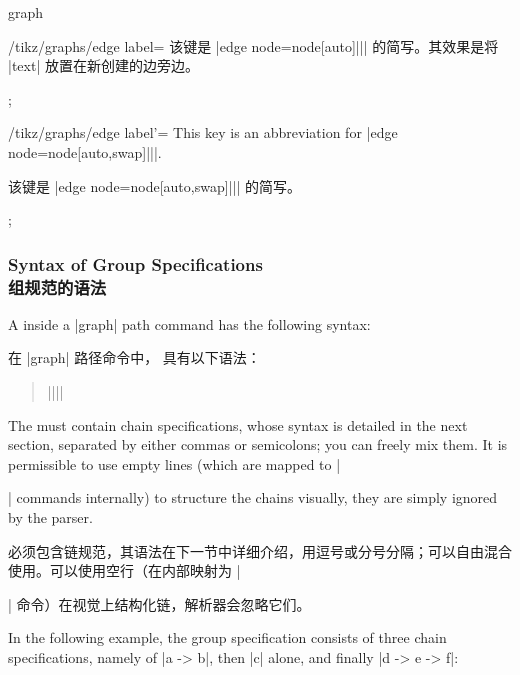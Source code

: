 \begin{pathoperation}{graph}{}
\begin{key}{/tikz/graphs/edge label=}
        该键是 |edge node=node[auto]{||}| 的简写。其效果是将 |text| 放置在新创建的边旁边。

%
\begin{codeexample}[preamble={\usetikzlibrary{graphs}}]
\tikz {};
\end{codeexample}
    \end{key}

    \begin{key}{/tikz/graphs/edge label'=}
        This key is an abbreviation for |edge node=node[auto,swap]{||}|.
        
        该键是 |edge node=node[auto,swap]{||}| 的简写。

%
\begin{codeexample}[preamble={\usetikzlibrary{graphs.standard}}]
\tikz {};
\end{codeexample}
    \end{key}
\end{pathoperation}


\subsubsection{Syntax of Group Specifications\\组规范的语法}
\label{section-library-graphs-group-spec}

A  inside a |graph| path command has the following
syntax:

在 |graph| 路径命令中， 具有以下语法：
%
\begin{quote}
    |{||}|
\end{quote}
%
The  must contain chain specifications, whose syntax
is detailed in the next section, separated by either commas or semicolons; you
can freely mix them. It is permissible to use empty lines (which are mapped to
|\par| commands internally) to structure the chains visually, they are simply
ignored by the parser.

 必须包含链规范，其语法在下一节中详细介绍，用逗号或分号分隔；可以自由混合使用。可以使用空行（在内部映射为 |\par| 命令）在视觉上结构化链，解析器会忽略它们。

In the following example, the group specification consists of three chain
specifications, namely of |a -> b|, then |c| alone, and finally |d -> e -> f|:

